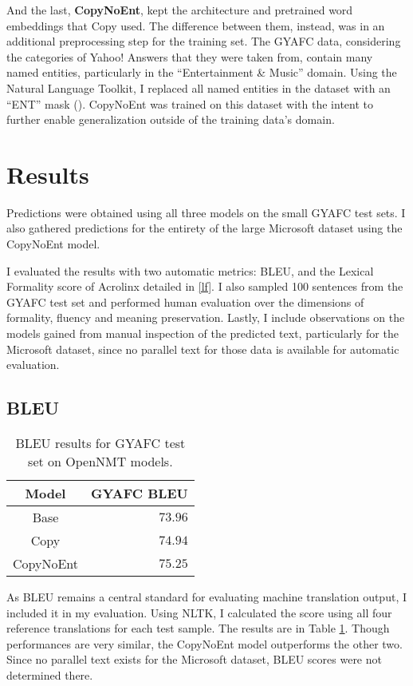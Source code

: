 And the last, \textbf{CopyNoEnt}, kept the architecture and pretrained word embeddings that Copy used. The difference between them, instead, was in an additional preprocessing step for the training set. The GYAFC data, considering the categories of Yahoo! Answers that they were taken from, contain many named entities, particularly in the ``Entertainment \& Music'' domain. Using the Natural Language Toolkit, I replaced all named entities in the dataset with an ``ENT'' mask (\cite{bird2009nltk}). CopyNoEnt was trained on this dataset with the intent to further enable generalization outside of the training data's domain.

\section{Results}

Predictions were obtained using all three models on the small GYAFC test sets. I also gathered predictions for the entirety of the large Microsoft dataset using the CopyNoEnt model.

I evaluated the results with two automatic metrics: BLEU, and the Lexical Formality score of Acrolinx detailed in \ref{lf}. I also sampled 100 sentences from the GYAFC test set and performed human evaluation over the dimensions of formality, fluency and meaning preservation. Lastly, I include observations on the models gained from manual inspection of the predicted text, particularly for the Microsoft dataset, since no parallel text for those data is available for automatic evaluation.

\subsection{BLEU}

\begin{table}[h]
\centering
 \begin{tabular}{|| c | r ||} 
 \hline
 Model & GYAFC BLEU \\ [0.3ex] 
 \hline\hline
 Base & $73.96$ \\
 \hline
 Copy & $74.94$ \\
 \hline
 CopyNoEnt & $75.25$ \\
 \hline
\end{tabular}
\caption{BLEU results for GYAFC test set on OpenNMT models.}
\label{opennmtbleu}
\end{table}

As BLEU remains a central standard for evaluating machine translation output, I included it in my evaluation. Using NLTK, I calculated the score using all four reference translations for each test sample. The results are in Table \ref{opennmtbleu}. Though performances are very similar, the CopyNoEnt model outperforms the other two. Since no parallel text exists for the Microsoft dataset, BLEU scores were not determined there.

